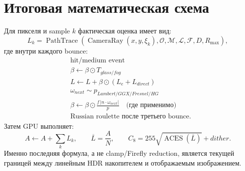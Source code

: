 \documentclass[11pt,a4paper]{article}
\begin{document}
\section{Итоговая математическая схема}

Для пикселя и sample $k$ фактическая оценка имеет вид:
\[
 L_k=\operatorname{PathTrace}\left(
 \operatorname{CameraRay}(x,y,\xi_k),
 \mathcal O,\mathcal M,\mathcal L,\mathcal F,D,R_{\max}
 \right),
\]
где внутри каждого bounce:
\[
 \begin{aligned}
 &\text{hit/medium event}\\
 &\beta\leftarrow\beta\odot T_{glass/fog}\\
 &L\leftarrow L+\beta\odot(L_e+L_{direct})\\
 &\omega_{next}\sim p_{Lambert/GGX/Fresnel/HG}\\
 &\beta\leftarrow\beta\odot\frac{f\,|n\cdot\omega_{next}|}{p}
   \quad\text{(где применимо)}\\
 &\text{Russian roulette после третьего bounce}.
 \end{aligned}
\]
Затем GPU выполняет:
\[
 A\leftarrow A+\sum_kL_k,\qquad
 \overline L=\frac{A}{N},\qquad
 C_{8}=255\sqrt{\operatorname{ACES}(\overline L)}+dither.
\]
Именно последняя формула, а не clamp/Firefly reduction, является текущей границей
между линейным HDR накопителем и отображаемым изображением.
\end{document}
